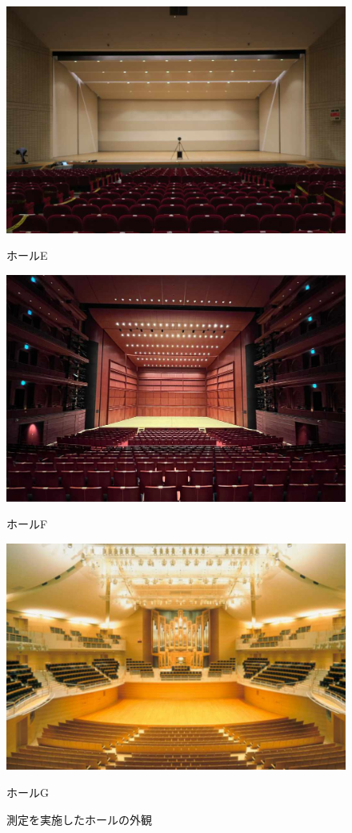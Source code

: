 \documentclass[11pt,a4j]{jreport}
\begin{document}
\begin{figure}[H]
  \begin{minipage}[b]{.5\textwidth}
    \centering
    \includegraphics[width=.9\linewidth]{images/measuredHalls/w90h60/picture_e.jpg}
    \caption*{ホールE}
  \end{minipage}%
  \begin{minipage}[b]{.5\textwidth}
    \centering
    \includegraphics[width=.9\linewidth]{images/measuredHalls/w90h60/picture_f.jpg}
    \caption*{ホールF}
  \end{minipage}

  \begin{minipage}[b]{1\textwidth}
    \centering
    \includegraphics[width=.45\linewidth]{images/measuredHalls/w90h60/picture_g.jpg}
    \caption*{ホールG}
  \end{minipage}

  \caption{測定を実施したホールの外観}
  \label{fig:全ホールの写真}
\end{figure}
\end{document}
